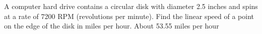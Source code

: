 {A computer hard drive contains a circular disk with diameter 2.5 inches and spins at a rate of 7200 RPM (revolutions per minute).  Find the linear speed of a point on the edge of the disk in miles per hour. \label{harddrive} }
{About 53.55 miles per hour}